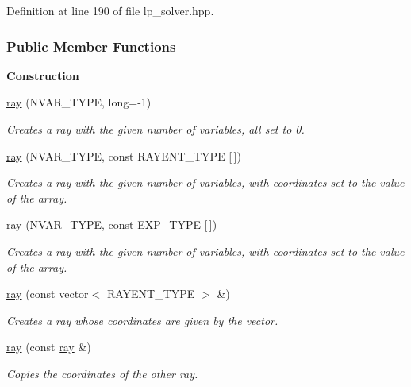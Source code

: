 Definition at line 190 of file lp\+\_\+solver.\+hpp.

\subsubsection*{Public Member Functions}
\begin{Indent}\textbf{ Construction}\par
\begin{DoxyCompactItemize}
\item 
\hyperlink{group___c_l_s_solvers_a48d51151bb229b2b3363869760fe4b3c}{ray} (N\+V\+A\+R\+\_\+\+T\+Y\+PE, long=-\/1)
\begin{DoxyCompactList}\small\item\em Creates a ray with the given number of variables, all set to 0. \end{DoxyCompactList}\item 
\hyperlink{group___c_l_s_solvers_a121e66bf83dfa1582edc24505bbc8095}{ray} (N\+V\+A\+R\+\_\+\+T\+Y\+PE, const R\+A\+Y\+E\+N\+T\+\_\+\+T\+Y\+PE \mbox{[}$\,$\mbox{]})
\begin{DoxyCompactList}\small\item\em Creates a ray with the given number of variables, with coordinates set to the value of the array. \end{DoxyCompactList}\item 
\hyperlink{group___c_l_s_solvers_a3639433d20b97abc32b56ca93779dcaf}{ray} (N\+V\+A\+R\+\_\+\+T\+Y\+PE, const E\+X\+P\+\_\+\+T\+Y\+PE \mbox{[}$\,$\mbox{]})
\begin{DoxyCompactList}\small\item\em Creates a ray with the given number of variables, with coordinates set to the value of the array. \end{DoxyCompactList}\item 
\hyperlink{group___c_l_s_solvers_a6387c9c134132709f29770212648c718}{ray} (const vector$<$ R\+A\+Y\+E\+N\+T\+\_\+\+T\+Y\+PE $>$ \&)
\begin{DoxyCompactList}\small\item\em Creates a ray whose coordinates are given by the vector. \end{DoxyCompactList}\item 
\hyperlink{group___c_l_s_solvers_af4ec5bf395f8b37cb7c4fd7f27999a5d}{ray} (const \hyperlink{group___c_l_s_solvers_classray}{ray} \&)
\begin{DoxyCompactList}\small\item\em Copies the coordinates of the other ray. \end{DoxyCompactList}\end{DoxyCompactItemize}
\end{Indent}
